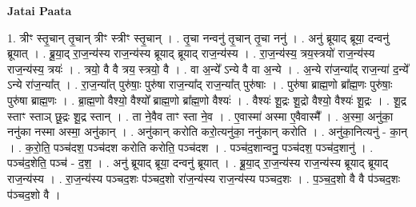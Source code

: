 \documentclass[17pt]{extarticle}
\begin{document}
\textbf{Jatai Paata} \newline

1. त्रीꣳ स्तृ॒चान् तृ॒चान् त्रीꣳ स्त्रीꣳ स्तृ॒चान् । . तृ॒चा नन्वनु॑ तृ॒चान् तृ॒चा ननु॑ । . अनु॑ ब्रूयाद् ब्रूया॒ दन्वनु॑ ब्रूयात् । . ब्रू॒या॒द् रा॒ज॒न्य॑स्य राज॒न्य॑स्य ब्रूयाद् ब्रूयाद् राज॒न्य॑स्य । . रा॒ज॒न्य॑स्य॒ त्रय॒स्त्रयो॑ राज॒न्य॑स्य राज॒न्य॑स्य॒ त्रयः॑ । . त्रयो॒ वै वै त्रय॒ स्त्रयो॒ वै । . वा अ॒न्ये᳚ ऽन्ये वै वा अ॒न्ये । . अ॒न्ये रा॑ज॒न्या᳚द् राज॒न्या॑ द॒न्ये᳚ ऽन्ये रा॑ज॒न्या᳚त् । . रा॒ज॒न्या᳚त् पुरु॑षाः॒ पुरु॑षा राज॒न्या᳚द् राज॒न्या᳚त् पुरु॑षाः । . पुरु॑षा ब्राह्म॒णो ब्रा᳚ह्म॒णः पुरु॑षाः॒ पुरु॑षा ब्राह्म॒णः । . ब्रा॒ह्म॒णो वैश्यो॒ वैश्यो᳚ ब्राह्म॒णो ब्रा᳚ह्म॒णो वैश्यः॑ । . वैश्यः॑ शू॒द्रः शू॒द्रो वैश्यो॒ वैश्यः॑ शू॒द्रः । . शू॒द्र स्ताꣳ स्ताञ् छू॒द्रः शू॒द्र स्तान् । . ता ने॒वैव ताꣳ स्ता ने॒व । . ए॒वास्मा॑ अस्मा ए॒वैवास्मै᳚ । . अ॒स्मा॒ अनु॑का॒ ननु॑का नस्मा अस्मा॒ अनु॑कान् । . अनु॑कान् करोति करो॒त्यनु॑का॒ ननु॑कान् करोति । . अनु॑का॒नित्यनु॑ - का॒न् । . क॒रो॒ति॒ पञ्च॑दश॒ पञ्च॑दश करोति करोति॒ पञ्च॑दश । . पञ्च॑द॒शान्वनु॒ पञ्च॑दश॒ पञ्च॑द॒शानु॑ । . पञ्च॑द॒शेति॒ पञ्च॑ - द॒श॒ । . अनु॑ ब्रूयाद् ब्रूया॒ दन्वनु॑ ब्रूयात् । . ब्रू॒या॒द् रा॒ज॒न्य॑स्य राज॒न्य॑स्य ब्रूयाद् ब्रूयाद् राज॒न्य॑स्य । . रा॒ज॒न्य॑स्य पञ्चद॒शः प॑ञ्चद॒शो रा॑ज॒न्य॑स्य राज॒न्य॑स्य पञ्चद॒शः । . प॒ञ्च॒द॒शो वै वै प॑ञ्चद॒शः प॑ञ्चद॒शो वै । \newline
\end{document}
